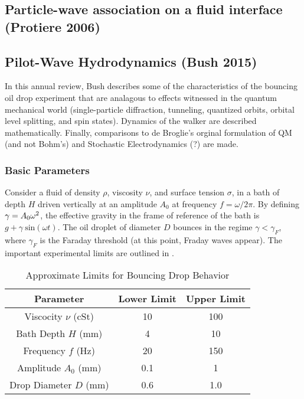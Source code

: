 	    \subsection{Particle-wave association on a fluid interface (Protiere 2006)}
	
	    \subsection{Pilot-Wave Hydrodynamics (Bush 2015)}
	    In this annual review, Bush describes some of the characteristics of the bouncing oil drop experiment that are analagous to effects witnessed in the quantum mechanical world (single-particle diffraction, tunneling, quantized orbits, orbital level splitting, and spin states). Dynamics of the walker are described mathematically. Finally, comparisons to de Broglie's orginal formulation of QM (and not Bohm's) and Stochastic Electrodynamics (?) are made. 
	    \subsubsection{Basic Parameters}
	       Consider a fluid of density $\rho$, viscosity $\nu$, and surface tension $\sigma$, in a bath of depth $H$ driven vertically at an amplitude $A_0$ at frequency $f=\omega/{2\pi}$. By defining $\mathnormal{\gamma}=A_0\omega^2$, the effective gravity in the frame of reference of the bath is $g+\gamma~\mathrm{sin}(\omega t)$. The oil droplet of diameter $D$ bounces in the regime $\gamma<\gamma_F$, where $\gamma_F$ is the Faraday threshold (at this point, Fraday waves appear). The important experimental limits are outlined in . 
	       \begin{table}[htdp] 
\caption[Basic Table 1]{Approximate Limits for Bouncing Drop Behavior} 
\begin{center} 
\begin{tabular}{c c c} 
\toprule 
  Parameter &  Lower Limit & Upper Limit \\
  \midrule
Viscocity $\nu$ (cSt) & 10 & 100 \\ 
Bath Depth $H$ (mm) & 4 & 10 \\
Frequency $f$ (Hz) & 20 & 150 \\
Amplitude $A_0$ (mm) & 0.1 & 1 \\
Drop Diameter $D$ (mm) & 0.6 & 1.0 \\
\bottomrule 
\end{tabular}
\end{center}
\label{approxlimits} 
\end{table}	

